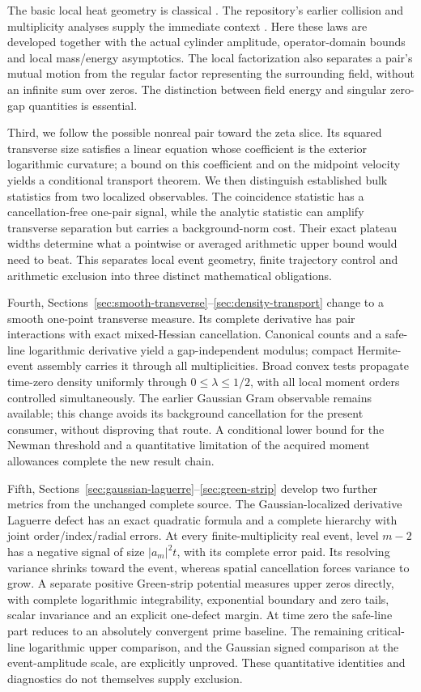 The basic local heat geometry is classical \cite{Angenent1991}. The
repository's earlier collision and multiplicity analyses supply the
immediate context \cite{TNDDirectCollision,HeatMultiplicity}. Here these
laws are developed together with the actual cylinder amplitude,
operator-domain bounds and local mass/energy asymptotics. The local
factorization also separates a pair's mutual motion from the regular
factor representing the surrounding field, without an infinite sum over
zeros. The distinction between field energy and singular zero-gap
quantities is essential.

Third, we follow the possible nonreal pair toward the zeta slice.
Its squared transverse size satisfies a linear equation whose coefficient
is the exterior logarithmic curvature; a bound on this coefficient and
on the midpoint velocity yields a conditional transport theorem.
We then distinguish established bulk statistics from two localized
observables. The coincidence statistic has a cancellation-free one-pair
signal, while the analytic statistic can amplify transverse separation
but carries a background-norm cost. Their exact plateau widths determine
what a pointwise or averaged arithmetic upper bound would need to beat.
This separates local event geometry, finite trajectory control and
arithmetic exclusion into three distinct mathematical obligations.

Fourth, Sections~\ref{sec:smooth-transverse}--\ref{sec:density-transport}
change to a smooth one-point transverse measure. Its complete derivative
has pair interactions with exact mixed-Hessian cancellation. Canonical
counts and a safe-line logarithmic derivative yield a gap-independent
modulus; compact Hermite-event assembly carries it through all
multiplicities. Broad convex tests propagate time-zero density uniformly
through \(0\le\lambda\le1/2\), with all local moment orders controlled
simultaneously. The earlier Gaussian Gram observable remains available;
this change avoids its background cancellation for the present consumer,
without disproving that route. A conditional lower bound for the Newman
threshold and a quantitative limitation of the acquired moment allowances
complete the new result chain.

Fifth, Sections~\ref{sec:gaussian-laguerre}--\ref{sec:green-strip}
develop two further metrics from the unchanged complete source. The
Gaussian-localized derivative Laguerre defect has an exact quadratic
formula and a complete hierarchy with joint order/index/radial errors.
At every finite-multiplicity real event, level \(m-2\) has a negative
signal of size \(|a_m|^2t\), with its complete error paid. Its resolving
variance shrinks toward the event, whereas spatial cancellation forces
variance to grow. A separate positive Green-strip potential measures
upper zeros directly, with complete logarithmic integrability,
exponential boundary and zero tails, scalar invariance and an explicit
one-defect margin. At time zero the safe-line part reduces to an
absolutely convergent prime baseline. The remaining critical-line
logarithmic upper comparison, and the Gaussian signed comparison at the
event-amplitude scale, are explicitly unproved. These quantitative
identities and diagnostics do not themselves supply exclusion.

